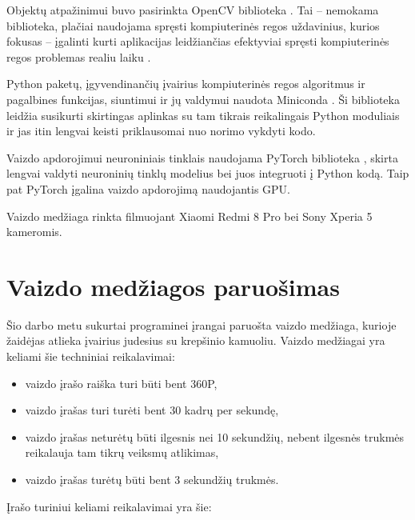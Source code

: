 \documentclass{VUMIFPSbakalaurinis}
\begin{document}
Objektų atpažinimui buvo pasirinkta OpenCV biblioteka \cite{opencv}. Tai – nemokama biblioteka, plačiai naudojama spręsti kompiuterinės regos uždavinius, kurios fokusas – įgalinti kurti aplikacijas leidžiančias efektyviai spręsti kompiuterinės regos problemas realiu laiku \cite{BradskiOpenCV}.

Python paketų, įgyvendinančių įvairius kompiuterinės regos algoritmus ir pagalbines funkcijas, siuntimui ir jų valdymui naudota Miniconda \cite{conda}. Ši biblioteka leidžia susikurti skirtingas aplinkas su tam tikrais reikalingais Python moduliais ir jas itin lengvai keisti priklausomai nuo norimo vykdyti kodo.

Vaizdo apdorojimui neuroniniais tinklais naudojama PyTorch biblioteka \cite{pytorch}, skirta lengvai valdyti neuroninių tinklų modelius bei juos integruoti į Python kodą. Taip pat PyTorch įgalina vaizdo apdorojimą naudojantis GPU. 

Vaizdo medžiaga rinkta filmuojant Xiaomi Redmi 8 Pro bei Sony Xperia 5 kameromis.  

\section{Vaizdo medžiagos paruošimas}

Šio darbo metu sukurtai programinei įrangai paruošta vaizdo medžiaga, kurioje žaidėjas atlieka įvairius judesius su krepšinio kamuoliu. Vaizdo medžiagai yra keliami šie techniniai reikalavimai: 

\begin{itemize}
	\item vaizdo įrašo raiška turi būti bent 360P,
	\item vaizdo įrašas turi turėti bent 30 kadrų per sekundę,
	\item vaizdo įrašas neturėtų būti ilgesnis nei 10 sekundžių, nebent ilgesnės trukmės reikalauja tam tikrų veiksmų atlikimas,
	\item vaizdo įrašas turėtų būti bent 3 sekundžių trukmės.
\end{itemize}

Įrašo turiniui keliami reikalavimai yra šie:
\end{document}

